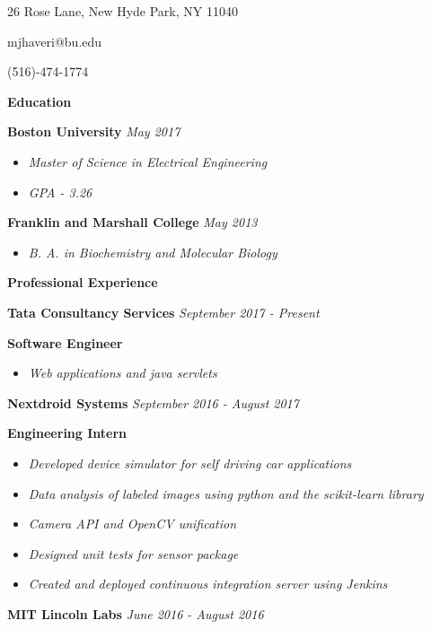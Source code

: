 \documentclass[8pt]{extarticle}
\begin{document}
\begin{center} 

26 Rose Lane, New Hyde Park, NY 11040

mjhaveri@bu.edu 

(516)-474-1774 
\end{center} 
\begin{changemargin}{-0.8cm}{0.0cm}
\textbf{Education}
\end{changemargin}
\vspace*{-0.4cm}
\makebox[\linewidth]{\rule{17cm}{0.4pt}}
\textbf{Boston University} \textit{May 2017}
\begin{itemize}
\item \textit{Master of Science in Electrical Engineering}
\item \textit{GPA - 3.26}
\end{itemize}
\textbf{Franklin and Marshall College} \textit{May 2013}
\begin{itemize}
\item \textit{B. A. in Biochemistry and Molecular Biology }

\end{itemize}

\begin{changemargin}{-0.8cm}{0.0cm}
\textbf{Professional Experience}
\end{changemargin}
\vspace*{-0.4cm}
\makebox[\linewidth]{\rule{17cm}{0.4pt}}
\textbf{Tata Consultancy Services} \textit{September 2017 - Present}

{\tiny }
\textbf{Software Engineer}
\begin{itemize}
\item \textit{Web applications and java servlets}
\end{itemize}
\textbf{Nextdroid Systems} \textit{September 2016 - August 2017}

{\tiny }
\textbf{Engineering Intern} 
\begin{itemize}
\item \textit{Developed device simulator for self driving car applications}
\item \textit{Data analysis of labeled images using python and the scikit-learn library}
\item \textit{Camera API and OpenCV unification}
\item \textit{Designed unit tests for sensor package}
\item \textit{Created and deployed continuous integration server using Jenkins}
\end{itemize}
\textbf{MIT Lincoln Labs} \textit{June  2016 - August 2016}
\end{document}

